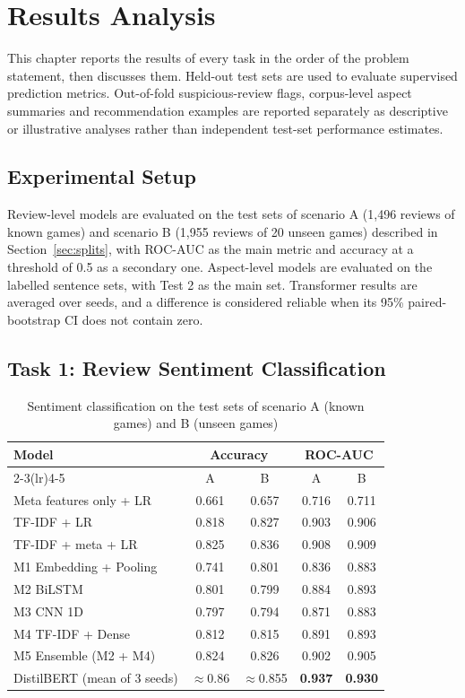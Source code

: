 \chapter{Results Analysis}
\label{chap:results}

This chapter reports the results of every task in the order of the problem statement, then discusses them. Held-out test sets are used to evaluate supervised prediction metrics. Out-of-fold suspicious-review flags, corpus-level aspect summaries and recommendation examples are reported separately as descriptive or illustrative analyses rather than independent test-set performance estimates.

\section{Experimental Setup}

Review-level models are evaluated on the test sets of scenario A (1,496 reviews of known games) and scenario B (1,955 reviews of 20 unseen games) described in Section~\ref{sec:splits}, with ROC-AUC as the main metric and accuracy at a threshold of 0.5 as a secondary one. Aspect-level models are evaluated on the labelled sentence sets, with Test 2 as the main set. Transformer results are averaged over seeds, and a difference is considered reliable when its 95\% paired-bootstrap CI does not contain zero.

\section{Task 1: Review Sentiment Classification}

\begin{table}[!htbp]
\centering
\caption{Sentiment classification on the test sets of scenario A (known games) and B (unseen games)}
\label{tab:sentiment}
\begin{tabular}{lcccc}
\toprule
\multirow{2}{*}{\textbf{Model}} & \multicolumn{2}{c}{\textbf{Accuracy}} & \multicolumn{2}{c}{\textbf{ROC-AUC}} \\
\cmidrule(lr){2-3}\cmidrule(lr){4-5}
 & A & B & A & B \\
\midrule
Meta features only + LR & 0.661 & 0.657 & 0.716 & 0.711 \\
TF-IDF + LR & 0.818 & 0.827 & 0.903 & 0.906 \\
TF-IDF + meta + LR & 0.825 & 0.836 & 0.908 & 0.909 \\
\midrule
M1 Embedding + Pooling & 0.741 & 0.801 & 0.836 & 0.883 \\
M2 BiLSTM & 0.801 & 0.799 & 0.884 & 0.893 \\
M3 CNN 1D & 0.797 & 0.794 & 0.871 & 0.883 \\
M4 TF-IDF + Dense & 0.812 & 0.815 & 0.891 & 0.893 \\
M5 Ensemble (M2 + M4) & 0.824 & 0.826 & 0.902 & 0.905 \\
\midrule
DistilBERT (mean of 3 seeds) & $\approx$0.86 & $\approx$0.855 & \textbf{0.937} & \textbf{0.930} \\
\bottomrule
\end{tabular}
\end{table}

